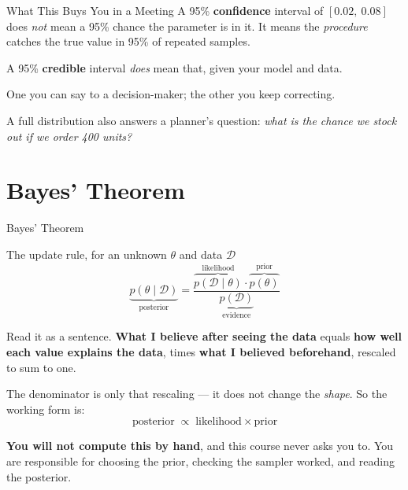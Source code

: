 \documentclass[aspectratio=169, 11pt]{beamer}
\begin{document}
\begin{frame}{What This Buys You in a Meeting}
  A 95\% \textbf{confidence} interval of $[0.02,\ 0.08]$ does \emph{not} mean a 95\% chance the
  parameter is in it. It means the \emph{procedure} catches the true value in 95\% of repeated
  samples.

  \vspace{0.15cm}
  A 95\% \textbf{credible} interval \emph{does} mean that, given your model and data.

  \begin{keybox}
    One you can say to a decision-maker; the other you keep correcting.
  \end{keybox}

  \vspace{0.1cm}
  A full distribution also answers a planner's question: \emph{what is the chance we stock out
  if we order 400 units?}

  \vspace{0.1cm}
\end{frame}

\section{Bayes' Theorem}


\begin{frame}{Bayes' Theorem \parencite{Gelman2013}}
  \begin{definitionbox}{The update rule, for an unknown $\theta$ and data $\mathcal{D}$}
    \[
      \underbrace{p(\theta \mid \mathcal{D})}_{\text{posterior}}
      = \frac{\overbrace{p(\mathcal{D} \mid \theta)}^{\text{likelihood}}
              \cdot \overbrace{p(\theta)}^{\text{prior}}}
             {\underbrace{p(\mathcal{D})}_{\text{evidence}}}
    \]
  \end{definitionbox}

  Read it as a sentence. \textbf{What I believe after seeing the data} equals \textbf{how well
  each value explains the data}, times \textbf{what I believed beforehand}, rescaled to sum to one.

  \vspace{0.1cm}
  The denominator is only that rescaling --- it does not change the \emph{shape}. So the working
  form is:
  \[
    \text{posterior} \;\propto\; \text{likelihood} \times \text{prior}
  \]
  \vspace{-0.3cm}

  \textbf{You will not compute this by hand}, and this course never asks you to. You are
  responsible for choosing the prior, checking the sampler worked, and reading the posterior.
\end{frame}
\end{document}
